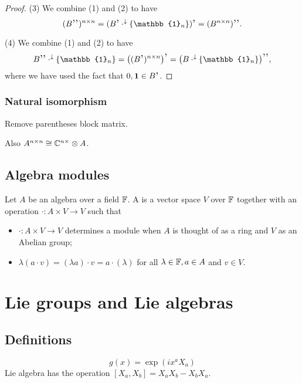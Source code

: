 \begin{proof}
(3) We combine (1) and (2) to have
\[ (B^{\comm\comm})^{n\times n} = (B^{\comm}\cdot^\imf\{\mathbb{1}_n\})^{\comm} = (B^{n\times n})^{\comm\comm}. \]

(4) We combine (1) and (2) to have
\[ B^{\comm\comm}\cdot^\imf\{\mathbb{1}_n\} = \big((B^{\comm})^{n\times n}\big)^{\comm} = \big(B\cdot^\imf\{\mathbb{1}_n\}\big)^{\comm\comm}, \]
where we have used the fact that $0, \vec{1} \in B^{\comm}$.
\end{proof}

\subsection{Natural isomorphism}
Remove parentheses block matrix.

Also $A^{n\times n} \cong \mathbb{C}^{n\times }\otimes A$.

\section{Algebra modules}
\begin{definition}
Let $A$ be an algebra over a field $\mathbb{F}$. A  is a vector space $V$ over $\mathbb{F}$ together with an operation $\cdot: A\times V \to V$ such that
\begin{itemize}
\item $\cdot: A\times V \to V$ determines a module when $A$ is thought of as a ring and $V$ as an Abelian group;
\item $\lambda(a\cdot v) = (\lambda a)\cdot v = a\cdot (\lambda)$ for all $\lambda\in \mathbb{F}, a\in A$ and $v\in V$.
\end{itemize}
\end{definition}

\chapter{Lie groups and Lie algebras}
\section{Definitions}
\[ g(x) = \exp(ix^aX_a) \]
Lie algebra has the operation $[X_a,X_b]= X_aX_b - X_bX_a$. 
